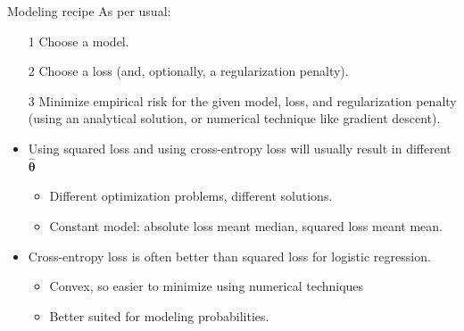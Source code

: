 \documentclass[aspectratio=169]{../latex_main/tntbeamer}  %
\begin{document}
	
	\begin{frame}[c]{Modeling recipe}
	    As per usual:
	    \begin{itemize}
	        \item[1]  Choose a model.
	        \item[2] Choose a loss (and, optionally, a regularization penalty).
	        \item[3] Minimize empirical risk for the given model, loss, and regularization penalty (using an analytical solution, or numerical technique like gradient descent).
	    \end{itemize}

	    \begin{itemize}
	        \item Using squared loss and using cross-entropy loss will usually result in different  $\hat{\bm{\theta}}$
	        \begin{itemize}
	            \item Different optimization problems, different solutions.
	            \item  Constant model: absolute loss meant median, squared loss meant mean.
	        \end{itemize}
	        \item Cross-entropy loss is often better than squared loss for logistic regression.
	        \begin{itemize}
	            \item Convex, so easier to minimize using numerical techniques
	            \item Better suited for modeling probabilities.
	        \end{itemize}
	    \end{itemize}
	\end{frame}
	
\end{document}
